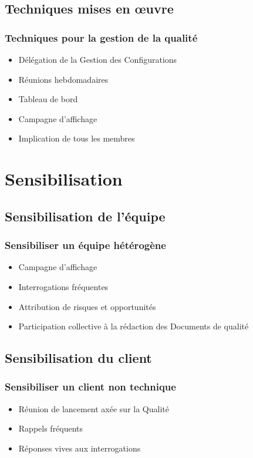 \documentclass[compress,xcolor=dvipsnames]{beamer}
\begin{document}
\subsection{Techniques mises en \oe{}uvre}
\begin{frame}
\frametitle{Techniques pour la gestion de la qualité}
\begin{itemize}
\item Délégation de la Gestion des Configurations
\item Réunions hebdomadaires
\item Tableau de bord
\item Campagne d'affichage
\item Implication de tous les membres
\end{itemize}
\end{frame}


\section{Sensibilisation}
\subsection{Sensibilisation de l’équipe}
\begin{frame}
\frametitle{Sensibiliser un équipe hétérogène}
\begin{itemize}
\item Campagne d'affichage
\item Interrogations fréquentes
\item Attribution de risques et opportunités
\item Participation collective à la rédaction des Documents de qualité
\end{itemize}
\end{frame}


\subsection{Sensibilisation du client}
\begin{frame}
\frametitle{Sensibiliser un client non technique}
\begin{itemize}
\item Réunion de lancement axée sur la Qualité
\item Rappels fréquents
\item Réponses vives aux interrogations
\end{itemize}
\end{frame}
\end{document}
